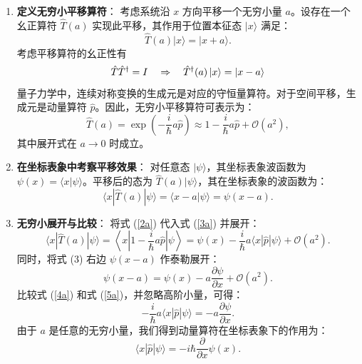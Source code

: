 \begin{enumerate}
	\item \textbf{定义无穷小平移算符}：
	考虑系统沿 $x$ 方向平移一个无穷小量 $a$。设存在一个幺正算符 $\hat{T}(a)$ 实现此平移，其作用于位置本征态 $|x\rangle$ 满足：
	\begin{equation}
		\hat{T}(a) |x\rangle = |x + a\rangle.
	\end{equation}
	考虑平移算符的幺正性有
	\[\hat T{\hat T^\dag } = I\quad \Rightarrow \quad {\hat T^\dag(a) }\ket{x} = \ket{x-a}\]
	量子力学中，连续对称变换的生成元是对应的守恒量算符。对于空间平移，生成元是动量算符 $\hat{p}$。因此，无穷小平移算符可表示为：
	\begin{equation}\label{2a}
		\hat{T}(a) = \exp\left(-\frac{i}{\hbar} a \hat{p}\right) \approx 1 - \frac{i}{\hbar} a \hat{p} + \mathcal{O}(a^2),
	\end{equation}
	其中展开式在 $a \to 0$ 时成立。
	
	\item \textbf{在坐标表象中考察平移效果}：
	对任意态 $|\psi\rangle$，其坐标表象波函数为 $\psi(x) = \langle x | \psi \rangle$。平移后的态为 $\hat{T}(a) |\psi\rangle$，其在坐标表象的波函数为：
	\begin{equation}\label{3a}
		\langle x | \hat{T}(a) | \psi \rangle = \langle x - a | \psi \rangle = \psi(x - a).
	\end{equation}
	
	\item \textbf{无穷小展开与比较}：
	将式 (\ref{2a}) 代入式 (\ref{3a}) 并展开：
	\begin{equation}\label{4a}
		\langle x | \hat{T}(a) | \psi \rangle = \left\langle x \left| 1 - \frac{i}{\hbar} a \hat{p} \right| \psi \right\rangle = \psi(x) - \frac{i}{\hbar} a \langle x | \hat{p} | \psi \rangle + \mathcal{O}(a^2).
	\end{equation}
	同时，将式 (3) 右边 $\psi(x - a)$ 作泰勒展开：
	\begin{equation}\label{5a}
		\psi(x - a) = \psi(x) - a \frac{\partial \psi}{\partial x} + \mathcal{O}(a^2).
	\end{equation}
	比较式 (\ref{4a}) 和式 (\ref{5a})，并忽略高阶小量，可得：
	\begin{equation}
		- \frac{i}{\hbar} a \langle x | \hat{p} | \psi \rangle = - a \frac{\partial \psi}{\partial x}.
	\end{equation}
	由于 $a$ 是任意的无穷小量，我们得到动量算符在坐标表象下的作用为：
	\begin{equation}
		\boxed{\langle x | \hat{p} | \psi \rangle = -i\hbar \frac{\partial}{\partial x} \psi(x)}.
	\end{equation}
\end{enumerate}

